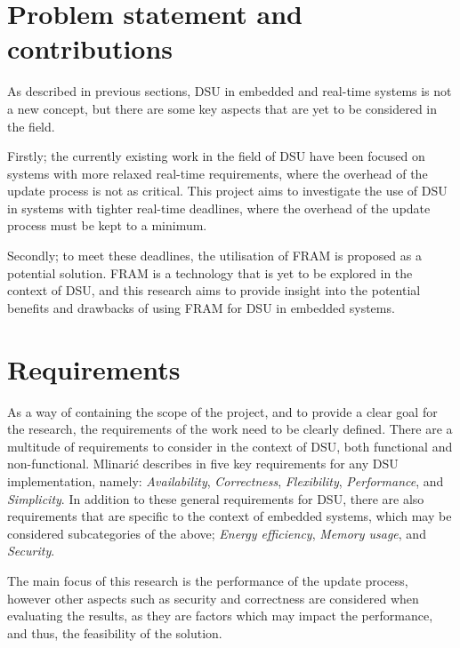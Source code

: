 \section{Problem statement and contributions}
As described in previous sections, DSU in embedded and real-time systems is not a new concept, but there are some key aspects that are yet to be considered in the field. 

Firstly; the currently existing work in the field of DSU have been focused on systems with more relaxed real-time requirements, where the overhead of the update process is not as critical. This project aims to investigate the use of DSU in systems with tighter real-time deadlines, where the overhead of the update process must be kept to a minimum.

Secondly; to meet these deadlines, the utilisation of FRAM is proposed as a potential solution. FRAM is a technology that is yet to be explored in the context of DSU, and this research aims to provide insight into the potential benefits and drawbacks of using FRAM for DSU in embedded systems.

\section{Requirements}
As a way of containing the scope of the project, and to provide a clear goal for the research, the requirements of the work need to be clearly defined. There are a multitude of requirements to consider in the context of DSU, both functional and non-functional. Mlinarić describes in \cite{dsuChallenges} five key requirements for any DSU implementation, namely: \textit{Availability}, \textit{Correctness}, \textit{Flexibility}, \textit{Performance}, and \textit{Simplicity}. In addition to these general requirements for DSU, there are also requirements that are specific to the context of embedded systems, which may be considered subcategories of the above; \textit{Energy efficiency}, \textit{Memory usage}, and \textit{Security}.

The main focus of this research is the performance of the update process, however other aspects such as security and correctness are considered when evaluating the results, as they are factors which may impact the performance, and thus, the feasibility of the solution.
